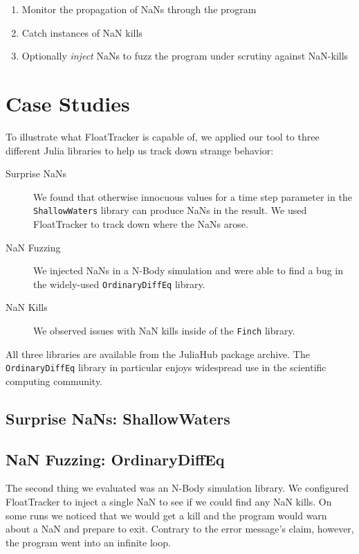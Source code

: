 \documentclass{juliacon}
\begin{document}
\begin{enumerate}
  \item Monitor the propagation of NaNs through the program
  \item Catch instances of NaN kills
  \item Optionally \emph{inject} NaNs to fuzz the program under scrutiny against NaN-kills
\end{enumerate}

%

\section{Case Studies}

To illustrate what FloatTracker is capable of, we applied our tool to three different Julia libraries to help us track down strange behavior:

\begin{description}
\item[Surprise NaNs] We found that otherwise innocuous values for a time step parameter in the \texttt{ShallowWaters} library can produce NaNs in the result.
  We used FloatTracker to track down where the NaNs arose.
\item[NaN Fuzzing] We injected NaNs in a N-Body simulation and were able to find a bug in the widely-used \texttt{OrdinaryDiffEq} library.
\item[NaN Kills] We observed issues with NaN kills inside of the \texttt{Finch} library.
\end{description}

All three libraries are available from the JuliaHub package archive.
The \texttt{OrdinaryDiffEq} library in particular enjoys widespread use in the scientific computing community.

\subsection{Surprise NaNs: ShallowWaters}

\subsection{NaN Fuzzing: OrdinaryDiffEq}

The second thing we evaluated was an N-Body simulation library.
We configured FloatTracker to inject a single NaN to see if we could find any NaN kills.
On some runs we noticed that we would get a kill and the program would warn about a NaN and prepare to exit.
Contrary to the error message's claim, however, the program went into an infinite loop.
\end{document}
